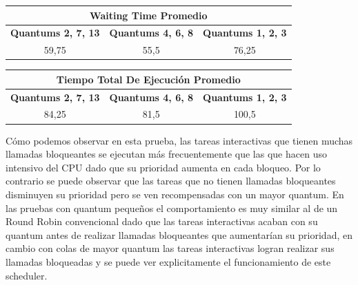 \begin{center}
	\begin{tabular}{|c|c|c|}
		\hline
		\multicolumn{3}{|c|}{\large{\textbf{Waiting Time Promedio}}} \\
		\hline
		\textbf{Quantums 2, 7, 13} & \textbf{Quantums 4, 6, 8} & \textbf{Quantums 1, 2, 3} \\
		\hline
		59,75 & 55,5 & 76,25 \\
		\hline
	\end{tabular}
\end{center}

\begin{center}
	\begin{tabular}{|c|c|c|}
		\hline
		\multicolumn{3}{|c|}{\large{\textbf{Tiempo Total De Ejecución Promedio}}} \\
		\hline
		\textbf{Quantums 2, 7, 13} & \textbf{Quantums 4, 6, 8} & \textbf{Quantums 1, 2, 3} \\
		\hline
		84,25 & 81,5 & 100,5 \\
		\hline
	\end{tabular}
\end{center}

Cómo podemos observar en esta prueba, las tareas interactivas que tienen muchas llamadas bloqueantes se ejecutan más frecuentemente que las que hacen uso intensivo del CPU dado que su prioridad aumenta en cada bloqueo. Por lo contrario se puede observar que las tareas que no tienen llamadas bloqueantes disminuyen su prioridad pero se ven recompensadas con un mayor quantum. En las pruebas con quantum pequeños el comportamiento es muy similar al de un Round Robin convencional dado que las tareas interactivas acaban con su quantum antes de realizar llamadas bloqueantes que aumentarían su prioridad, en cambio con colas de mayor quantum las tareas interactivas logran realizar sus llamadas bloqueadas y se puede ver explicitamente el funcionamiento de este scheduler.